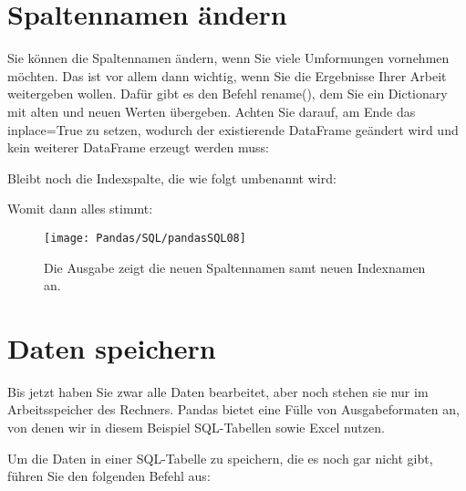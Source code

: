 \section{Spaltennamen ändern}

Sie können die Spaltennamen ändern, wenn Sie viele Umformungen vornehmen möchten. Das ist vor allem dann wichtig, wenn Sie die Ergebnisse Ihrer Arbeit weitergeben wollen. Dafür gibt es den Befehl rename(), dem Sie ein Dictionary mit alten und neuen Werten übergeben. Achten Sie darauf, am Ende das inplace=True zu setzen, wodurch der existierende DataFrame geändert wird und kein weiterer DataFrame erzeugt werden muss:

\medskip



\medskip


Bleibt noch die Indexspalte, die wie folgt umbenannt wird:

\medskip



\medskip


Womit dann alles stimmt:

\begin{figure}
	\texttt{[image: Pandas/SQL/pandasSQL08]}
	\caption{Die Ausgabe zeigt die neuen Spaltennamen samt neuen Indexnamen an.}
\end{figure}



\section{Daten speichern}

Bis jetzt haben Sie zwar alle Daten bearbeitet, aber noch stehen sie nur im Arbeitsspeicher des Rechners. Pandas bietet eine Fülle von Ausgabeformaten an, von denen wir in diesem Beispiel SQL-Tabellen sowie Excel nutzen.

Um die Daten in einer SQL-Tabelle zu speichern, die es noch gar nicht gibt, führen Sie den folgenden Befehl aus:

\medskip


